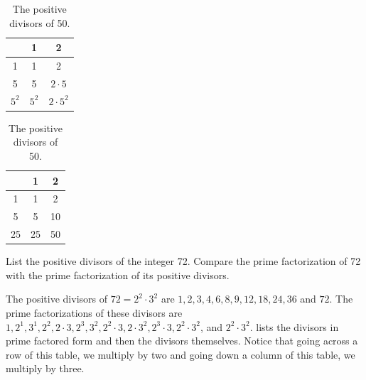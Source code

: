\begin{exam}
\begin{apart}
            \begin{table}[hbtp]
            \centering
                \begin{tabular} {c| |c |c }
                & 1& 2    \\ \hline \hline
                1 & 1& 2  \\ \hline
                5 & 5 & $2\cdot 5$ \\ \hline
                $5^2$ & $5^2$ & $2\cdot 5^2$ \\
                \end{tabular}
                    \hspace{1in}
                \begin{tabular} {c| |c |c }
                & 1& 2    \\ \hline \hline
                1 & 1& 2  \\ \hline
                5 & 5 & 10 \\ \hline
                25 & 25 & 50 \\
                \end{tabular}
            \caption{The positive divisors of 50.}
            \label{table_divisors50}
            \end{table}
            
        \item \label{part_list_div72}  List the positive divisors of the integer 72. Compare the prime factorization of 72 with the prime factorization of its positive divisors.
            \begin{soln}
                The positive divisors of $72=2^2 \cdot 3^2$ are $1, 2, 3, 4, 6, 8, 9, 12, 18, 24, 36$ and $72$.   The prime factorizations of these divisors are $1, 2^1, 3^1, 2^2, 2 \cdot 3, 2^3, 3^2, 2^2 \cdot 3, 2 \cdot 3^2, 2^3 \cdot 3, 2^2 \cdot 3^2$, and $2^2 \cdot 3^2$.  lists the divisors in prime factored form and then the divisors themselves. Notice that going across a row of this table, we multiply by two and going down a column of this table, we multiply by three. 


\end{soln}
\end{apart}
\end{exam}
